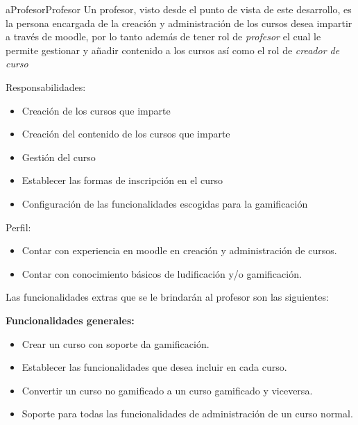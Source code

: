    \begin{actor}{aProfesor}{Profesor}{%
    Un profesor, visto desde el punto de vista de este desarrollo, es la persona
    encargada de la creación y administración de los cursos desea impartir a través
    de moodle, por lo tanto además de tener rol de {\it profesor} el cual le permite
    gestionar y añadir contenido a los cursos así como el rol de {\it creador de
    curso} \cite{MoodleRoles} \\}

    \item[Responsabilidades:] \hfill
        \begin{itemize}
        \item Creación de los cursos que imparte
        \item Creación del contenido de los cursos que imparte
        \item Gestión del curso
        \item Establecer las formas de inscripción en el curso
        \item Configuración de las funcionalidades escogidas para la gamificación
        \end{itemize}

    \item[Perfil:] \hfill
        \begin{itemize}
        \item Contar con experiencia en moodle en creación y administración de cursos.
        \item Contar con conocimiento básicos de ludificación y/o gamificación.
        \end{itemize}
    \end{actor}

    \noindent
    Las funcionalidades extras que se le brindarán al profesor son las siguientes:


    {\bf Funcionalidades generales:}
        \begin{itemize}
        \item Crear un curso con soporte da gamificación.
        \item Establecer las funcionalidades que desea incluir en cada curso.
        \item Convertir un curso no gamificado a un curso gamificado y viceversa.
        \item Soporte para todas las funcionalidades de administración de un curso
              normal.
        \end{itemize}

